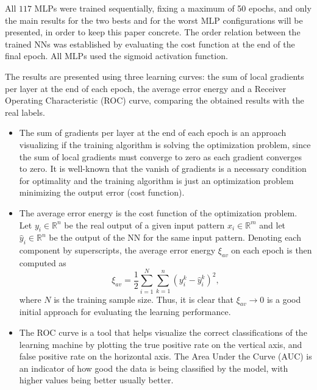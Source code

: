 \documentclass[conference]{IEEEtran}
\theoremstyle{definition}
\theoremstyle{remark}
\theoremstyle{remark}
\begin{document}
All $117$ MLPs were trained sequentially, fixing a maximum of 50 epochs,
and only the main results for the two bests and for the worst MLP configurations
will be presented, in order to keep this paper concrete. The order relation
between the trained NNs was established by evaluating the cost function at the
end of the final epoch. All MLPs used the sigmoid activation function.

The results are presented using three learning curves: the sum of local
gradients per layer at the end of each epoch, the average error energy and a
Receiver Operating Characteristic (ROC) curve, comparing the obtained results
with the real labels.
\begin{itemize}
  \item The sum of gradients per layer at the end of each epoch is an approach
  visualizing if the training algorithm is solving the optimization problem,
  since the sum of local gradients must converge to zero as each gradient
  converges to zero. It is well-known that the vanish of gradients is a
  necessary condition for optimality and the training algorithm is just an
  optimization problem minimizing the output error (cost function).
  \item The average error energy is the cost function of the optimization
  problem. Let $y_i\in\mathbb{R}^n$ be the real output of a given input pattern
  $x_i\in\mathbb{R}^m$ and let $\hat{y}_i\in\mathbb{R}^n$ be the output of the
  NN for the same input pattern. Denoting each component by superscripts, the
  average error energy $\xi_{av}$ on each epoch is then computed as
\begin{equation}
\xi_{av}=\dfrac{1}{2}\sum_{i=1}^{N}\sum_{k=1}^n\left(y^k_i-\hat{y}^k_i\right)^2,
\end{equation}
  where $N$ is the training sample size. Thus, it is clear that
  $\xi_{av}\rightarrow0$ is a good initial approach for evaluating the
  learning performance.
  \item The ROC curve is a tool that helps visualize the correct classifications
  of the learning machine by plotting the true positive rate on the vertical
  axis, and false positive rate on the horizontal axis. The Area Under the Curve
  (AUC) is an indicator of how good the data is being classified by the model,
  with higher values being better usually better.
\end{itemize}
\end{document}
